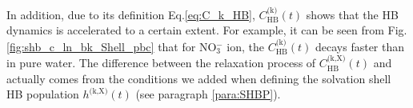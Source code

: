 In addition, due to its definition Eq.\thinspace\ref{eq:C_k_HB}, $C^\text{(k)}_\text{HB}(t)$ shows that the HB dynamics is accelerated to a certain extent. 
For example, it can be seen from Fig.\thinspace\ref{fig:shb_c_ln_bk_Shell_pbc} 
that for NO$^-_3$ ion, the $C^\text{(k)}_\text{HB}(t)$ decays faster than \CHB in pure water.
The difference between the relaxation process of $C^\text{(k,X)}_{\text{HB}}(t)$ and \CHB actually comes from the conditions 
we added when defining the solvation shell HB population $h^\text{(k,X)}(t)$ (see paragraph \thinspace\ref{para:SHBP}).
%
%
\FloatBarrier
